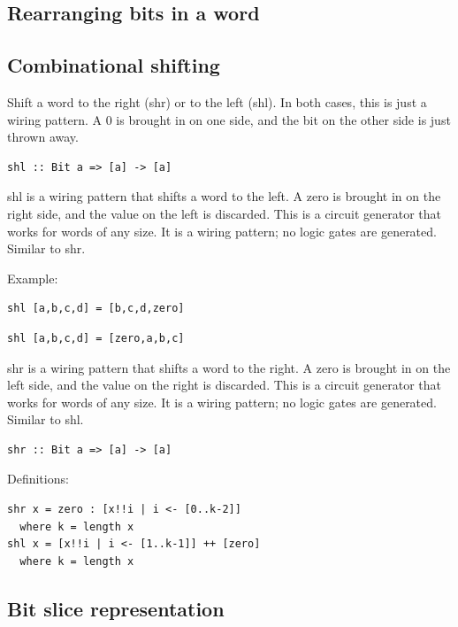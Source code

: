 \documentclass[]{svmono}
\begin{document}
\subsection*{Rearranging bits in a word}
\label{sec:org3822119}

\subsection*{Combinational shifting}
\label{sec:org377c47d}

Shift a word to the right (shr) or to the left (shl).  In both cases,
this is just a wiring pattern.  A 0 is brought in on one side, and the
bit on the other side is just thrown away.



\begin{verbatim}
shl :: Bit a => [a] -> [a]
\end{verbatim}


shl is a wiring pattern that shifts a word to the left.  A zero is
brought in on the right side, and the value on the left is discarded.
This is a circuit generator that works for words of any size.  It is a
wiring pattern; no logic gates are generated.  Similar to shr.

Example:


\begin{verbatim}
shl [a,b,c,d] = [b,c,d,zero]
\end{verbatim}


\begin{verbatim}
shl [a,b,c,d] = [zero,a,b,c]
\end{verbatim}


shr is a wiring pattern that shifts a word to the right.  A zero is
brought in on the left side, and the value on the right is discarded.
This is a circuit generator that works for words of any size.  It is a
wiring pattern; no logic gates are generated.  Similar to shl.


\begin{verbatim}
shr :: Bit a => [a] -> [a]
\end{verbatim}



Definitions:

\begin{verbatim}
shr x = zero : [x!!i | i <- [0..k-2]]
  where k = length x
shl x = [x!!i | i <- [1..k-1]] ++ [zero]
  where k = length x
\end{verbatim}
\subsection*{Bit slice representation}
\label{sec:org5e97d09}
\end{document}
